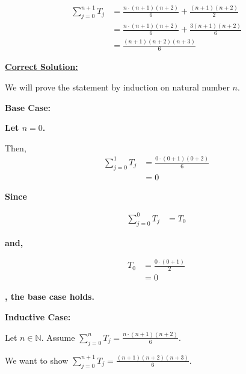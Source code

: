 \documentclass[12pt]{article}
\begin{document}
\begin{itemize}
    \begin{align}
        \sum\limits_{j=0}^{n+1} T_j &= \frac{n \cdot (n+1)(n+2)}{6} + \frac{(n+1)(n+2)}{2}\\
        &= \frac{n \cdot (n+1)(n+2)}{6} + \frac{3(n+1)(n+2)}{6}\\
        &= \frac{(n+1)(n+2)(n+3)}{6}
    \end{align}

    \begin{mdframed}
        \underline{\textbf{Correct Solution:}}

        We will prove the statement by induction on natural number $n$.

        \bigskip

        \textbf{Base Case:}

        \bigskip

        \color{red}
        \textbf{Let $n = 0$.}
        \color{black}

        \bigskip

        Then,
        \setcounter{equation}{0}
        \begin{align}
            \sum\limits_{j=0}^{1} T_j &= \frac{0 \cdot (0+1)(0+2)}{6}\\
            &= 0
        \end{align}

        \bigskip

        \color{red}
        \textbf{Since}

        \begin{align}
            \sum\limits_{j=0}^0 T_j &= T_0
        \end{align}

        \textbf{and,}

        \begin{align}
            T_0 &= \frac{0 \cdot (0+1)}{2}\\
            &= 0
        \end{align}

        \textbf{, the base case holds.}

        \color{black}

        \bigskip

        \textbf{Inductive Case:}

        \bigskip

        Let $n \in \mathbb{N}$. Assume $\sum\limits_{j=0}^n T_j = \frac{n \cdot (n+1)(n+2)}{6}$.

        \bigskip

        We want to show $\sum\limits_{j=0}^{n+1} T_j = \frac{(n+1)(n+2)(n+3)}{6}$.


\end{mdframed}
\end{itemize}
\end{document}
